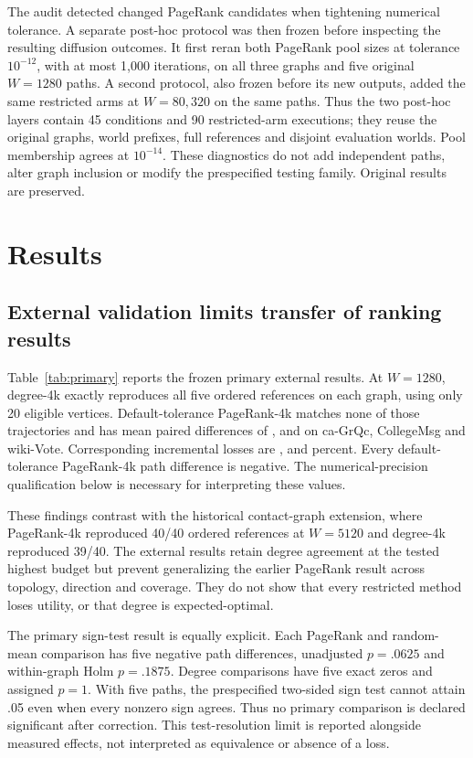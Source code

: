 \documentclass[smallextended]{svjour3}
\begin{document}
The audit detected changed PageRank candidates when tightening numerical tolerance. A separate post-hoc protocol was then frozen before inspecting the resulting diffusion outcomes. It first reran both PageRank pool sizes at tolerance $10^{-12}$, with at most 1,000 iterations, on all three graphs and five original $W=1280$ paths. A second protocol, also frozen before its new outputs, added the same restricted arms at $W=80,320$ on the same paths. Thus the two post-hoc layers contain 45 conditions and 90 restricted-arm executions; they reuse the original graphs, world prefixes, full references and disjoint evaluation worlds. Pool membership agrees at $10^{-14}$. These diagnostics do not add independent paths, alter graph inclusion or modify the prespecified testing family. Original results are preserved.

\section{Results}
\subsection{External validation limits transfer of ranking results}
Table~\ref{tab:primary} reports the frozen primary external results. At $W=1280$, degree-4k exactly reproduces all five ordered references on each graph, using only 20 eligible vertices. Default-tolerance PageRank-4k matches none of those trajectories and has mean paired differences of \GrqcPRDelta{}, \CollegePRDelta{} and \WikiPRDelta{} on ca-GrQc, CollegeMsg and wiki-Vote. Corresponding incremental losses are \GrqcPRLoss{}, \CollegePRLoss{} and \WikiPRLoss{} percent. Every default-tolerance PageRank-4k path difference is negative. The numerical-precision qualification below is necessary for interpreting these values.


These findings contrast with the historical contact-graph extension, where PageRank-4k reproduced 40/40 ordered references at $W=5120$ and degree-4k reproduced 39/40. The external results retain degree agreement at the tested highest budget but prevent generalizing the earlier PageRank result across topology, direction and coverage. They do not show that every restricted method loses utility, or that degree is expected-optimal.

The primary sign-test result is equally explicit. Each PageRank and random-mean comparison has five negative path differences, unadjusted $p=.0625$ and within-graph Holm $p=.1875$. Degree comparisons have five exact zeros and assigned $p=1$. With five paths, the prespecified two-sided sign test cannot attain .05 even when every nonzero sign agrees. Thus no primary comparison is declared significant after correction. This test-resolution limit is reported alongside measured effects, not interpreted as equivalence or absence of a loss.
\end{document}
